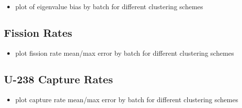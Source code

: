 \begin{itemize}[noitemsep]
  \item plot of eigenvalue bias by batch for different clustering schemes
\end{itemize}

\subsection{Fission Rates}

\begin{itemize}[noitemsep]
  \item plot fission rate mean/max error by batch for different clustering schemes
\end{itemize}

\subsection{U-238 Capture Rates}

\begin{itemize}
  \item plot capture rate mean/max error by batch for different clustering schemes
\end{itemize}